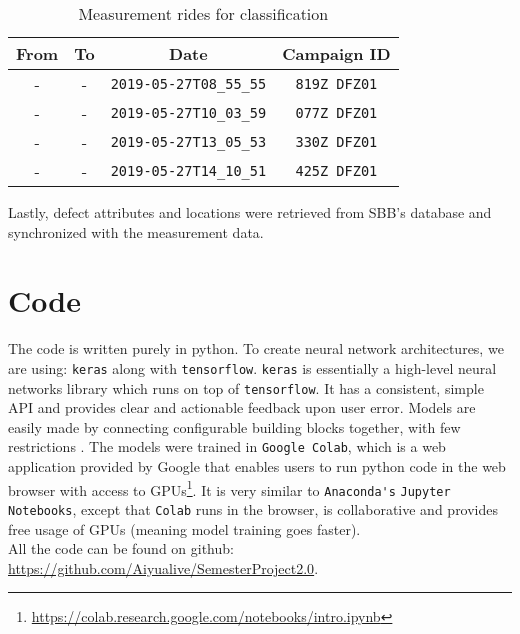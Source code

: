 \begin{table}[H]
	\centering
	\begin{tabular}{|c|c|c|c|} \hline
		\textbf{From} & \textbf{To} & \textbf{Date} & \textbf{Campaign ID}\\ \hline \hline 
		- & - &  \verb|2019-05-27T08_55_55| & \verb|819Z DFZ01| \\ \hline 
		- & - &  \verb|2019-05-27T10_03_59| & \verb|077Z DFZ01| \\ \hline 
		- & - &  \verb|2019-05-27T13_05_53| & \verb|330Z DFZ01| \\ \hline 
		- & - &  \verb|2019-05-27T14_10_51| & \verb|425Z DFZ01| \\ \hline 
	\end{tabular}
	\caption{Measurement rides for classification}
	\label{tab:rides}
\end{table}

Lastly, defect attributes and locations were retrieved from SBB's database and synchronized with the measurement data.

\section{Code}
\label{int:sec:code}
The code is written purely in python. To create neural network architectures, we are using: \verb|keras| along with \verb|tensorflow|. \verb|keras| is essentially a high-level neural networks library which runs on top of \verb|tensorflow|. It has a consistent, simple API and provides clear and actionable feedback upon user error. Models are easily made by connecting configurable building blocks together, with few restrictions \cite{TensorFl31:online}. The models were trained in \verb|Google Colab|, which is a web application provided by Google that enables users to run python code in the web browser with access to GPUs\footnote{\url{https://colab.research.google.com/notebooks/intro.ipynb}}. It is very similar to \verb|Anaconda's| \verb|Jupyter Notebooks|, except that \verb|Colab| runs in the browser, is collaborative and provides free usage of GPUs (meaning model training goes faster).\\


\noindent All the code can be found on github: \\
\url{https://github.com/Aiyualive/SemesterProject2.0}.\\

